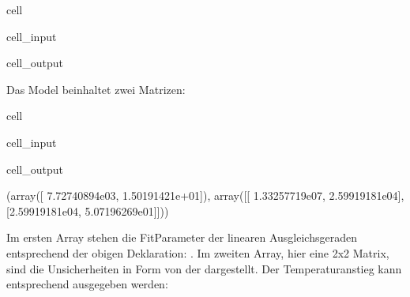 \documentclass[letterpaper,10pt,english]{jupyterBook}
\begin{document}
\begin{sphinxuseclass}{cell}
\begin{sphinxVerbatimInput}
\begin{sphinxuseclass}{cell_input}
\end{sphinxuseclass}\end{sphinxVerbatimInput}
\begin{sphinxVerbatimOutput}

\begin{sphinxuseclass}{cell_output}
\noindent{}

\end{sphinxuseclass}\end{sphinxVerbatimOutput}

\end{sphinxuseclass}
\sphinxAtStartPar
Das Model beinhaltet zwei Matrizen:

\begin{sphinxuseclass}{cell}\begin{sphinxVerbatimInput}

\begin{sphinxuseclass}{cell_input}
\begin{sphinxVerbatim}[commandchars=\\\{\}]
\end{sphinxVerbatim}

\end{sphinxuseclass}\end{sphinxVerbatimInput}
\begin{sphinxVerbatimOutput}

\begin{sphinxuseclass}{cell_output}
\begin{sphinxVerbatim}[commandchars=\\\{\}]
(array([ 7.72740894e\PYGZhy{}03, \PYGZhy{}1.50191421e+01]),
 array([[ 1.33257719e\PYGZhy{}07, \PYGZhy{}2.59919181e\PYGZhy{}04],
        [\PYGZhy{}2.59919181e\PYGZhy{}04,  5.07196269e\PYGZhy{}01]]))
\end{sphinxVerbatim}

\end{sphinxuseclass}\end{sphinxVerbatimOutput}

\end{sphinxuseclass}
\sphinxAtStartPar
Im ersten Array stehen die Fit\sphinxhyphen{}Parameter der linearen Ausgleichsgeraden entsprechend der obigen Deklaration: .
Im zweiten Array, hier eine 2x2 Matrix, sind die Unsicherheiten in Form von der  dargestellt.
Der Temperaturanstieg kann entsprechend ausgegeben werden:
\end{document}
